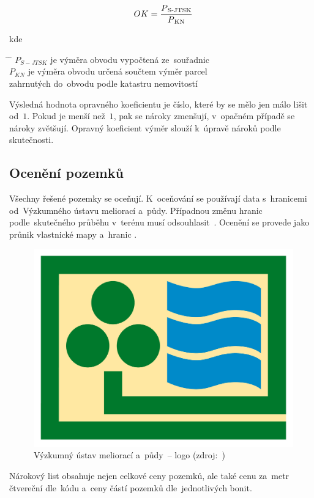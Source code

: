 \begin{equation}
	OK = \frac{P\textsubscript{S-JTSK}}{P\textsubscript{KN}}
\end{equation}

kde
\begin{tabbing}
\hspace{2em} \= \hspace{5em} \= \kill
	\> $P_{S-JTSK}$	\> je výměra obvodu vypočtená ze~souřadnic \\
	\> $P_{KN}$	\> je výměra obvodu určená součtem výměr parcel \\
	\> 				\> zahrnutých do~obvodu podle katastru nemovitostí
\end{tabbing}

Výsledná hodnota opravného koeficientu je číslo, které by se mělo jen málo lišit od~$1$. Pokud je  menší než~$1$, pak se nároky zmenšují, v~opačném případě se nároky zvětšují. Opravný koeficient výměr slouží k~úpravě nároků podle skutečnosti.

\subsection{Ocenění pozemků}
\label{oceneni}

Všechny řešené pozemky se oceňují. K~oceňování se používají data s~hranicemi  od~Výzkumného ústavu meliorací a~půdy. Případnou změnu hranic  podle~skutečného průběhu v~terénu musí odsouhlasit~. Ocenění se provede jako průnik vlastnické mapy a~hranic .

	\begin{figure}[H]
		\centering
		\includegraphics[width=.5\textwidth]{./pictures/vumop.png}
		\caption[Výzkumný ústav meliorací a~půdy~– logo]{Výzkumný ústav meliorací a~půdy~– logo (zdroj:~\citep{vumop})}
		\label{fig:vumop}
 	\end{figure}

Nárokový list obsahuje nejen celkové ceny pozemků, ale také cenu za~metr čtvereční dle~kódu  a~ceny částí pozemků dle~jednotlivých bonit.

